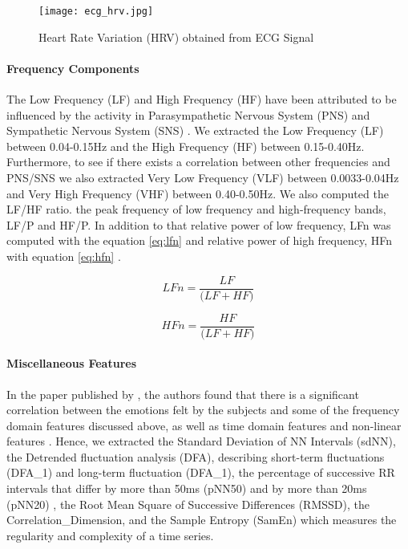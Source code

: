 \begin{figure}
    \centering
    \texttt{[image: ecg\_hrv.jpg]}
    \caption{Heart Rate Variation (HRV) obtained from ECG Signal}
    \label{fig:ecg_hrv}
\end{figure}

\paragraph{Frequency Components} The Low Frequency (LF) and High Frequency (HF) have been attributed to be influenced by the activity in Parasympathetic Nervous System (PNS) and Sympathetic Nervous System (SNS) \cite{noauthor_heart_1996} \cite{berntson_gary:1997}. We extracted the Low Frequency (LF) between 0.04-0.15Hz and the High Frequency (HF) between 0.15-0.40Hz. Furthermore, to see if there exists a correlation between other frequencies and PNS/SNS we also extracted Very Low Frequency (VLF) between 0.0033-0.04Hz and Very High Frequency (VHF) between 0.40-0.50Hz. We also computed the LF/HF ratio. the peak frequency of low frequency and high-frequency bands, LF/P and HF/P. In addition to that relative power of low frequency, LFn was computed with the equation \ref{eq:lfn} and relative power of high frequency, HFn with equation \ref{eq:hfn} \cite{shaffer_overview_2017}. 

\begin{equation}
\label{eq:lfn}
    LFn = \frac{LF}{\big(LF + HF)}
\end{equation}

\begin{equation}
\label{eq:hfn}
    HFn = \frac{HF}{\big(LF + HF)}
\end{equation}

\paragraph{Miscellaneous Features} In the paper published by \citeauthor{zhao_emotion_2016}, the authors found that there is a significant correlation between the emotions felt by the subjects and some of the frequency domain features discussed above, as well as time domain features and non-linear features \cite{zhao_emotion_2016}. Hence, we extracted the Standard Deviation of NN Intervals (sdNN), the Detrended fluctuation analysis (DFA), describing short-term fluctuations (DFA\_1) and long-term fluctuation (DFA\_1), the percentage of successive RR intervals that differ by more than 50ms (pNN50) and by more than 20ms (pNN20)  \cite{pend1995},  the Root Mean Square of Successive Differences (RMSSD), the Correlation\_Dimension, and the Sample Entropy (SamEn) which measures the regularity and complexity of a time series. 


